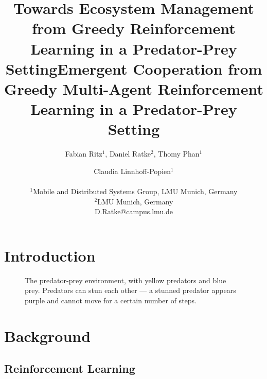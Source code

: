 \documentclass[letterpaper]{article}
\title{Towards Ecosystem Management from Greedy Reinforcement Learning in a Predator-Prey Setting}
\title{Emergent Cooperation from Greedy Multi-Agent Reinforcement Learning in a Predator-Prey Setting}
\author{Fabian Ritz$^{1}$, Daniel Ratke$^{2}$, Thomy Phan$^1$ \and Claudia Linnhoff-Popien$^1$ \\
\mbox{}\\
$^1$Mobile and Distributed Systems Group, LMU Munich, Germany \\
$^2$LMU Munich, Germany \\
D.Ratke@campus.lmu.de} %
\begin{document}
\maketitle

\begin{abstract}
    \blindtext[2]
\end{abstract}

\section{Introduction}

\blindtext[4]

\begin{figure}%
    \centering
    \caption{The predator-prey environment, with yellow predators and blue prey. Predators can stun each other --- a stunned predator appears purple and cannot move for a certain number of steps.}%
    \label{fig:aquarium}%
\end{figure}

\section{Background}

\subsection{Reinforcement Learning}

\blindtext[2]
\end{document}
